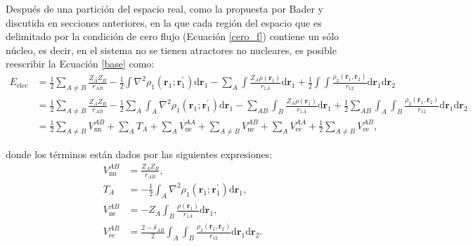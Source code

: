 Después de una partición del espacio real, como la propuesta por Bader y
discutida en secciones anteriores, en la que cada región del espacio que es
delimitado por la condición de cero flujo (Ecuación \ref{cero_f}) contiene un
sólo núcleo, es decir, en el sistema no se tienen atractores no nucleares, es
posible reescribir la Ecuación \ref{base} como:
%
\footnotesize
\begin{align} 
  E_{\mathrm{elec}}  &=  \frac{1}{2} \sum_{A \neq B} \frac{Z_A Z_B}{r_{AB}} 
  -\frac{1}{2} \int \nabla^2 \rho_1(\mathbf{r}_1;
  \mathbf{r}_1^{\prime}) \mathrm{d} \mathbf{r}_1
  -\sum_A  \int \frac{Z_A \rho(\mathbf{r}_1)}{r_{1A}} \mathrm{d} \mathbf{r}_1 
  +\frac{1}{2} \int \int \frac{\rho_2(\mathbf{r}_1,
  \mathbf{r}_2)}{r_{12}} \mathrm{d} \mathbf{r}_1
  \mathrm{d} \mathbf{r}_2 \nonumber \\
      &=  \frac{1}{2} \sum_{A \neq B} \frac{Z_A Z_B}{r_{AB}} 
  -\frac{1}{2} \sum_A  \int_A   \nabla^2 \rho_1(\mathbf{r}_1;
  \mathbf{r}_1^{\prime}) \mathrm{d} \mathbf{r}_1  
  -\sum_{AB} \int_B \frac{Z_A \rho(\mathbf{r}_1)}{r_{1A}} \mathrm{d} \mathbf{r}_1
  +\frac{1}{2} \sum_{AB} \int_A \int_B \frac{\rho_2(\mathbf{r}_1,
  \mathbf{r}_2)}{r_{12}} \mathrm{d} \mathbf{r}_1 \mathrm{d} \mathbf{r}_2 \nonumber \\
      &=  \frac{1}{2} \sum_{A \neq B} V_{\mathrm{nn}}^{AB}
  +\sum_A T_A + \sum_A V_{\mathrm{ne}}^{AA}
  +\sum_{A \neq B} V_{\mathrm{ne}}^{AB} + \sum_A V_{\mathrm{ee}}^{AA} 
  +\frac{1}{2} \sum_{A \neq B} V_{\mathrm{ee}}^{AB},
\end{align}
\normalsize

\noindent donde los términos están dados por las siguientes expresiones:
%
\begin{align}
  V_{\mathrm{nn}}^{AB} &=  \frac{Z_A Z_B}{r_{AB}}, \label{VnnAB} \\
  T_A                  &= -\frac{1}{2} \int_A \nabla^2 \rho_1 (\mathbf{r}_1;\mathbf{r}_1^{\prime})
    \mathrm{d} \mathbf{r}_1, \label{cineticaMono} \\
  V_{\mathrm{ne}}^{AB} &= - Z_A \int_B \frac{\rho(\mathbf{r}_1)}{r_{1A}} \mathrm{d}
	  \mathbf{r}_1, \label{nucleoElecMono} \\
  V_{\mathrm{ee}}^{AB} &= \frac{2 - \delta_{AB}}{2} \int_A \int_B
	  \frac{\rho_2(\mathbf{r}_1,\mathbf{r}_2)}{r_{12}} \mathrm{d} \mathbf{r}_1
	  \mathrm{d} \mathbf{r}_2. \label{elecElec2Atoms}
\end{align}


